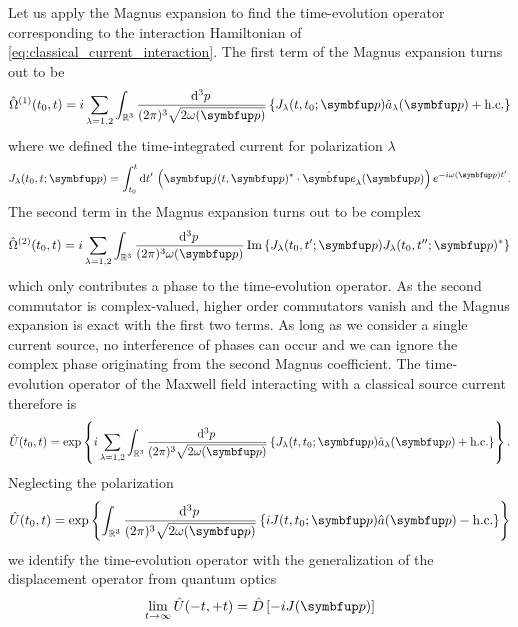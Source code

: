Let us apply the Magnus expansion to find the time-evolution operator corresponding to the interaction Hamiltonian of \cref{eq:classical_current_interaction}.
The first term of the Magnus expansion turns out to be
\begin{equation}
	\hat{\Omega}^{(1)}(t_0,t)
	=
	i
	\sum_{\lambda=1,2}
	\int_{\mathbb{R}^3}\frac{\dd[3]{p}}{(2\pi)^3\sqrt{2\omega(\vb{p})}}
	\left\{
		J_\lambda(t,t_0;\vb{p})
		\hat{a}_\lambda(\vb{p})
		+
		\text{h.c.}
	\right\}
\end{equation}
where we defined the time-integrated current for polarization $\lambda$
\begin{equation}
	J_\lambda(t_0,t;\vb{p})
	=
	\int_{t_0}^t\dd{t^\prime}
	\left(
		\vb{j}(t,\vb{p})^*
		\vdot
		\vu{e}_\lambda(\vb{p})
	\right)
	e^{-i\omega(\vb{p})t^\prime}
	.
\end{equation}
The second term in the Magnus expansion turns out to be complex
\begin{equation}
	\hat{\Omega}^{(2)}(t_0,t)
	=
	i\sum_{\lambda=1,2}
	\int_{\mathbb{R}^3}\frac{\dd[3]{p}}{(2\pi)^3\omega(\vb{p})}
	\Im\left\{
		J_\lambda(t_0,t^\prime;\vb{p})
		J_\lambda(t_0,t^{\prime\prime};\vb{p})^*
	\right\}
\end{equation}
which only contributes a phase to the time-evolution operator.
As the second commutator is complex-valued, higher order commutators vanish and the Magnus expansion is exact with the first two terms.
As long as we consider a single current source, no interference of phases can occur and we can ignore the complex phase originating from the second Magnus coefficient.
The time-evolution operator of the Maxwell field interacting with a classical source current therefore is~\cite[p.~168]{Itzykson2012}
\begin{equation}
	\hat{U}(t_0,t)
	=
	\exp\left\{
		i\sum_{\lambda=1,2}
		\int_{\mathbb{R}^3}\frac{\dd[3]{p}}{(2\pi) ^3\sqrt{2\omega(\vb{p})}}
		\left\{
			J_\lambda(t,t_0;\vb{p})
			\hat{a}_\lambda(\vb{p})
			+
			\text{h.c.}
		\right\}
	\right\}
	.
\end{equation}
Neglecting the polarization 
\begin{equation}
	\hat{U}(t_0,t)
	=
	\exp\left\{
		\int_{\mathbb{R}^3}\frac{\dd[3]{p}}{(2\pi) ^3\sqrt{2\omega(\vb{p})}}
		\left\{
			i
			J(t,t_0;\vb{p})
			\hat{a}(\vb{p})
			-
			\text{h.c.}
		\right\}
	\right\}
\end{equation}
we identify the time-evolution operator with the generalization of the displacement operator from quantum optics~\cite[p.~xx]{Barnett2002}
\begin{equation}
	\lim_{t\to\infty}\hat{U}(-t,+t)
	=
	\hat{D}\left[-iJ(\vb{p})\right]
\end{equation}
